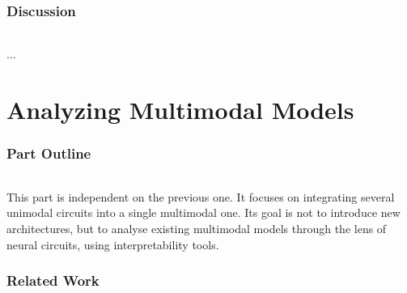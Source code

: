 \documentclass{article}
\begin{document}
\section{Discussion}

\paragraph{}...

\part{Analyzing Multimodal Models}

\section*{Part Outline}

\paragraph{}This part is independent on the previous one. It focuses on integrating several unimodal circuits into a single multimodal one. Its goal is not to introduce new architectures, but to analyse existing multimodal models through the lens of neural circuits, using interpretability tools.

\section{Related Work}
\end{document}
